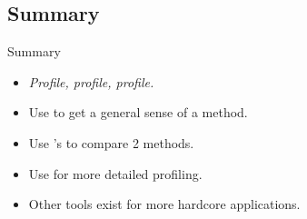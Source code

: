 \subsection{Summary}

\begin{frame}
  \begin{block}{Summary}
    \begin{itemize}
      \item \emph{Profile, profile, profile.}
      \item Use  to get a general sense of a method.
      \item Use 's  to compare 2 methods.
      \item Use  for more detailed profiling.
      \item Other tools exist for more hardcore applications.
    \end{itemize}
  \end{block}
\end{frame}

